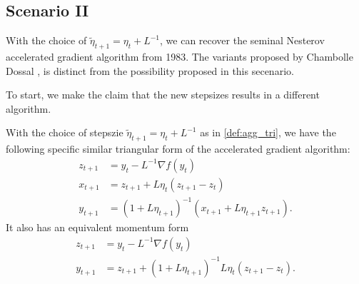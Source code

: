\documentclass[12pt]{article}
\begin{document}
    \subsection{Scenario II}
        With the choice of $\tilde \eta_{t + 1} = \eta_t + L^{-1}$, we can recover the seminal Nesterov accelerated gradient algorithm from 1983. 
        The variants proposed by Chambolle Dossal \cite{chambolle_convergence_2015}, is distinct from the possibility proposed in this secenario. 
        \par\noindent
        To start, we make the claim that the new stepsizes results in a different algorithm. 
        \begin{lemma}
            With the choice of stepszie $\tilde \eta_{t + 1} = \eta_t + L^{-1}$ as in \ref*{def:agg_tri}, we have the following specific similar triangular form of the accelerated gradient algorithm: 
            \begin{align*}
                z_{t + 1} &= y_t - L^{-1} \nabla f(y_t) 
                \\
                x_{t + 1} &= z_{t + 1} + L\eta_t (z_{t + 1} - z_t)
                \\
                y_{t + 1} &= 
                (1 + L\eta_{t + 1})^{-1}
                (
                x_{t + 1} + L\eta_{t + 1}z_{t + 1}
                ). 
            \end{align*}
            It also has an equivalent momentum form 
            \begin{align*}
                z_{t + 1} &= y_t - L^{-1}\nabla f(y_t)
                \\
                y_{t + 1} &= z_{t + 1} + (1 + L\eta_{t + 1})^{-1}L\eta_t (z_{t + 1} - z_t). 
            \end{align*}
        \end{lemma}
\end{document}
